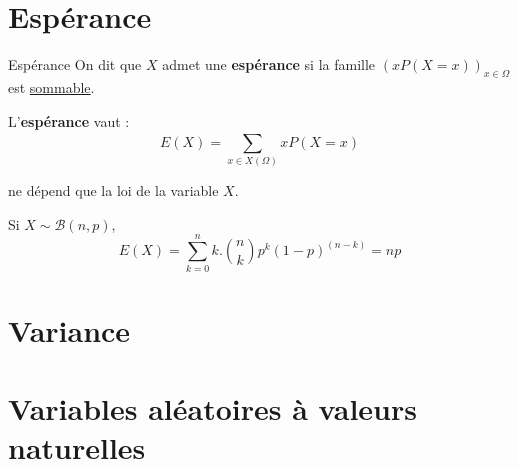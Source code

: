 \section{Espérance} %
\label{sec:Espérance}

\begin{Definition}[colbacktitle=red!75!black]{Espérance}{}
On dit que $X$ admet une \textbf{espérance} si la famille $(xP(X=x)) _{x \in \Omega}$ est \underline{sommable}. 

L'\textbf{espérance} vaut : 
\begin{equation}
  E(X) = \sum_{x \in X(\Omega)}^{} x P(X = x)
\end{equation}

ne dépend que la loi de la variable $X$.
\end{Definition}

\begin{Example}{}{}
Si $X \sim \mathcal{B}(n,p)$, 
\begin{equation}
  E(X) = \sum_{k=0}^{n} k. \binom{n}{k} p ^{k} (1-p) ^{(n-k)} = np
\end{equation}
\end{Example}




\section{Variance} %
\label{sec:Variance}

\section{Variables aléatoires à valeurs naturelles} %
\label{sec:Variables aléatoires à valeurs naturelles}



